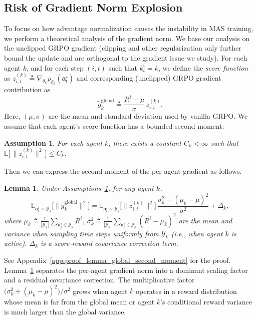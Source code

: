 \documentclass[]{fairmeta}
\theoremstyle{plain}
\newtheorem{lemma}[theorem]{Lemma}
\theoremstyle{definition}
\newtheorem{assumption}[theorem]{Assumption}
\theoremstyle{remark}
\begin{document}
\subsection{Risk of Gradient Norm Explosion}
\label{sec:risk}
To focus on how advantage normalization causes the instability in MAS training, we perform a theoretical analysis of the gradient norm. We base our analysis on the unclipped GRPO gradient (clipping and other regularization only further bound the update and are orthogonal to the gradient issue we study).
For each agent $k$, and for each step $(i,t)$ such that $k_t^i = k$, we define
the \emph{score function} as $z_{i,t}^{(k)} \triangleq \nabla_{\theta_k} \rho_{\theta_k}(\bm{a}_t^{i})$ and corresponding (unclipped) GRPO gradient contribution as
\begin{equation}
    \tilde{g}_k^{\mathrm{global}}
    \triangleq
    \frac{R^i - \mu}{\sigma}\,
    z_{i,t}^{(k)}.
\end{equation}
Here, $(\mu,\sigma)$ are the mean and standard deviation used by vanilla GRPO. We assume that each agent’s score function has a bounded second moment:
\begin{assumption}
\label{assump:score}
\emph{For each agent $k$, there exists a constant $C_k < \infty$ such that $\mathbb{E}\big[\,\|z_{i,t}^{(k)}\|^2\,\big] \le C_k$.}
\end{assumption}
Then we can express the second moment of the per-agent gradient as follows.
\begin{lemma}
\label{lem:global-second-moment}
Under Assumptions~\ref{assump:score}, for any agent $k$,
\begin{equation}
\nonumber
\mathbb{E}_{\bm{a}_t^i\sim \mathcal{Y}_k}\big[\|\tilde{g}_k^{\mathrm{global}}\|^2\big]
{=} \mathbb{E}_{\bm{a}_t^i\sim \mathcal{Y}_k}\big[\|z_{i,t}^{(k)}\|^2\big]\,
  \frac{\sigma_k^2 + (\mu_k - \mu)^2}{\sigma^2} + \Delta_k,
\end{equation}
where $\mu_k \triangleq \frac{1}{|\mathcal{Y}_k|}\sum_{\bm{a}_t^i\in \mathcal{Y}_k} R^i$, $\sigma_k^2 \triangleq \frac{1}{|\mathcal{Y}_k|}\sum_{\bm{a}_t^i\in \mathcal{Y}_k} (R^i - \mu_k)^2$
are the mean and variance when sampling
time steps uniformly from $\mathcal{Y}_k$ (i.e., when agent $k$ is active). $\Delta_k$ is a score-reward covariance correction term.
\end{lemma}
See Appendix~\ref{app:proof_lemma_global_second_moment} for the proof.
Lemma~\ref{lem:global-second-moment} separates the per-agent gradient norm into a dominant scaling factor and a residual covariance correction. The multiplicative factor $\bigl(\sigma_k^2+(\mu_k-\mu)^2\bigr)/\sigma^2$ grows when agent $k$ operates in a reward distribution whose mean is far from the global mean or agent $k$’s conditional reward variance is much larger than the global variance.
\end{document}

